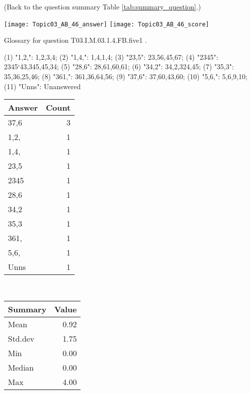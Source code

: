 \documentclass[12pt,english,nohyper]{tufte-handout}\usepackage[]{graphicx}\usepackage[]{color}
\begin{document}
 (Back to the question summary Table \ref{tab:summary_question}.)

\begin{center} \texttt{[image: Topic03\_AB\_46\_answer]} \texttt{[image: Topic03\_AB\_46\_score]} \end{center} 

Glossary for question T03.I.M.03.1.4.FB.five1 .

(1) "1,2,": 1,2,3,4; (2) "1,4,": 1,4,1,4; (3) "23,5": 23,56,45,67; (4) "2345": 2345`43,345,45,34; (5) "28,6": 28,61,60,61; (6) "34,2": 34,2,324,45; (7) "35,3": 35,36,25,46; (8) "361,": 361,36,64,56; (9) "37,6": 37,60,43,60; (10) "5,6,": 5,6,9,10; (11) "Unns": Unanswered

\begin{center}%
\begin{tabular}{lr}
  \hline
Answer & Count \\ 
  \hline
37,6 &   3 \\ 
  1,2, &   1 \\ 
  1,4, &   1 \\ 
  23,5 &   1 \\ 
  2345 &   1 \\ 
  28,6 &   1 \\ 
  34,2 &   1 \\ 
  35,3 &   1 \\ 
  361, &   1 \\ 
  5,6, &   1 \\ 
  Unns &   1 \\ 
   \hline
\end{tabular}
~~~~~~~~%
\begin{tabular}{lr}
  \hline
Summary & Value \\ 
  \hline
Mean & 0.92 \\ 
  Std.dev & 1.75 \\ 
  Min & 0.00 \\ 
  Median & 0.00 \\ 
  Max & 4.00 \\ 
   \hline
\end{tabular}
\end{center}\newpage{}
\end{document}
